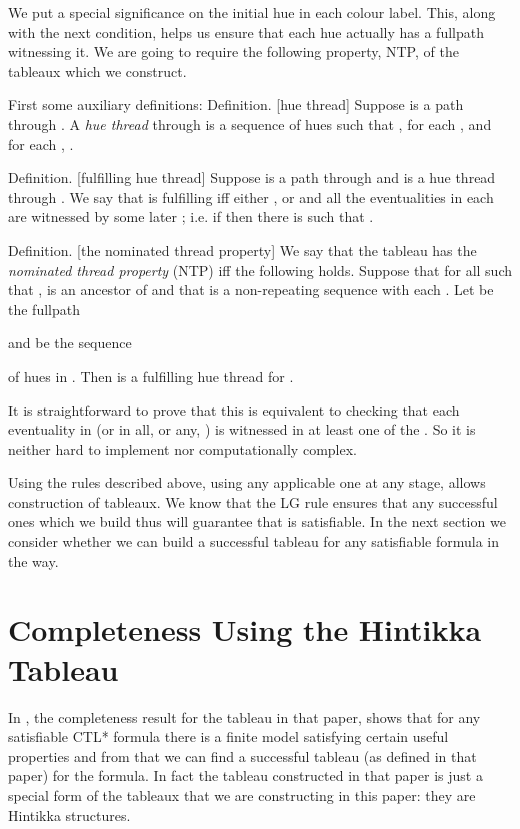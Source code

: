 \documentclass[submission,copyright,creativecommons]{eptcs}
\newenvironment{definition}{Definition. }{}
\begin{document}
We put a
special significance on the initial
hue in each colour label.
This, along with the next condition,
helps us ensure that each hue
actually has a fullpath
witnessing it.
We are going to require the following 
property, NTP,
of the tableaux which we construct.

First some auxiliary definitions:
\begin{definition}[hue thread]
Suppose  is a path through .
A {\em hue thread} through 
is
a sequence  of hues such that
,
for each , 
and for each ,
.
\end{definition}

\begin{definition}[fulfilling hue thread]
Suppose  is a path through  
and  is a  hue thread through .
We say that  is fulfilling iff
either ,
or 
  and all the eventualities in each
 are witnessed
by some later ;
i.e.
if 
then there is 
such that
.
\end{definition}


\begin{definition}[the nominated thread property]
We say that the tableau 
has the {\em nominated thread property}
(NTP) iff the following holds.
Suppose that
for all  such that ,  is an
ancestor of 
and that 
is a non-repeating sequence with each
 .
 Let  be the fullpath
 
 and
  be the sequence
 
 of hues in .
Then  is a fulfilling hue thread for .
\end{definition}

It is straightforward to prove that this
is equivalent to checking
that
each eventuality in 
(or in all, or any, )
is witnessed in at least one of the .
So it is neither hard 
to implement nor computationally complex.

Using the rules described above,
using any applicable one at any stage,
allows construction
of 
tableaux.
We know that the LG rule ensures that 
any successful ones which we build thus
will guarantee that  is
satisfiable.
In the next section we consider
whether we can build a successful tableau
for any satisfiable formula
in the way.


\section{Completeness Using the Hintikka Tableau}
\label{sec:completeness}

In \cite{Rey:startab}, the completeness result for the tableau
in that paper, shows that for
any satisfiable CTL* formula
 there is a finite model 
satisfying certain useful properties 
and 
from that we can find a successful tableau (as defined in that paper)
for the formula.
In fact the tableau constructed in that paper is just a special
form of the tableaux that we are constructing in this paper:
they are Hintikka structures.
\end{document}
